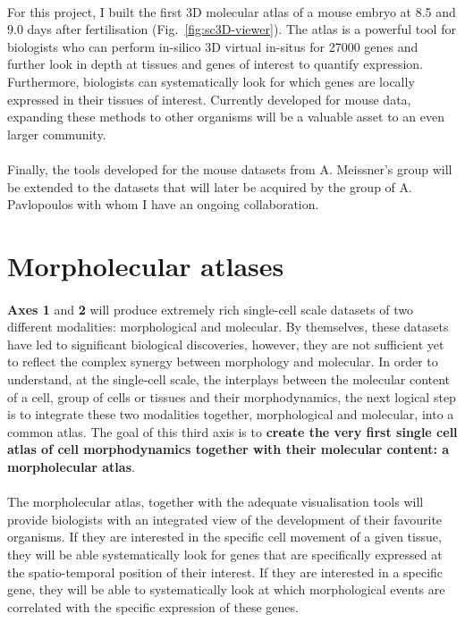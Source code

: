 \paragraph{}For this project, I built the first 3D molecular atlas of a mouse embryo at 8.5 and 9.0 days after fertilisation (Fig.~\ref{fig:sc3D-viewer}).
The atlas is a powerful tool for biologists who can perform in-silico 3D virtual in-situs for 27000 genes and further look in depth at tissues and genes of interest to quantify expression.
Furthermore, biologists can systematically look for which genes are locally expressed in their tissues of interest.
Currently developed for mouse data, expanding these methods to other organisms will be a valuable asset  to an even larger community.
\paragraph{}Finally, the tools developed for the mouse datasets from A. Meissner's group will be extended to the datasets that will later be acquired by the group of A. Pavlopoulos with whom I have an ongoing collaboration.
\section{Morpholecular atlases}\label{sec:morpholecular}
\paragraph{}\textbf{Axes 1} and \textbf{2} will produce extremely rich single-cell scale datasets of two different modalities: morphological and molecular.
By themselves, these datasets have led to significant biological discoveries, however, they are not sufficient yet to reflect the complex synergy between morphology and molecular.
In order to understand, at the single-cell scale, the interplays between the molecular content of a cell, group of cells or tissues and their morphodynamics, the next logical step is to integrate these two modalities together, morphological and molecular, into a common atlas.
The goal of this third axis is to \textbf{create the very first single cell atlas of cell morphodynamics together with their molecular content: a morpholecular atlas}.
\paragraph{}The morpholecular atlas, together with the adequate visualisation tools will provide biologists with an integrated view of the development of their favourite organisms.
If they are interested in the specific cell movement of a given tissue, they will be able systematically look for genes that are specifically expressed at the spatio-temporal position of their interest.
If they are interested in a specific gene, they will be able to systematically look at which morphological events are correlated with the specific expression of these genes.
